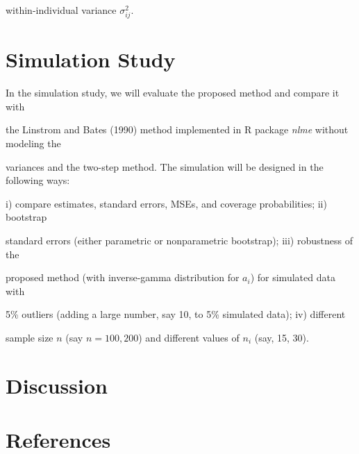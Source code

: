 \documentclass[12pt]{article}
\begin{document}
within-individual variance $\sigma_{ij}^2$. 





\section{Simulation Study}



    In the simulation study, we will evaluate the proposed method and compare it with 

the Linstrom and Bates (1990) method implemented in R package {\em nlme} without modeling the

variances and the two-step method. The simulation will be designed in the following ways: 

i) compare estimates, standard errors, MSEs, and coverage probabilities; ii) bootstrap 

standard errors (either parametric or nonparametric bootstrap); iii) robustness of the 

proposed method (with inverse-gamma distribution for $a_i$) for simulated data with 

5\% outliers (adding a large number, say 10, to 5\% simulated data); iv) different 

sample size $n$ (say $n=100, 200$) and different values of $n_i$ (say, 15, 30). 



\section{Discussion}



\section*{References}
\end{document}
